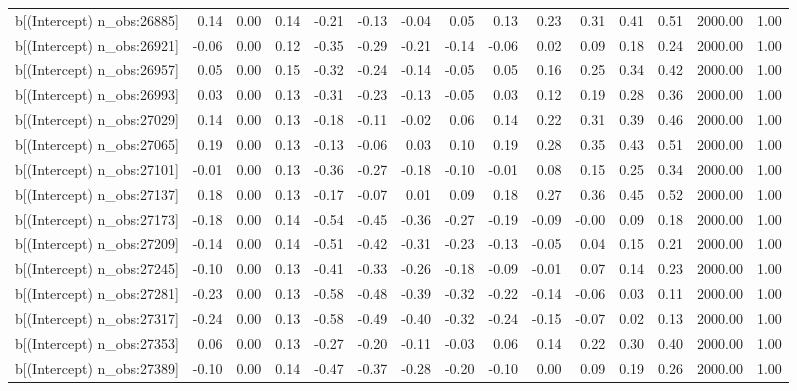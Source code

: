 \begin{table}[ht]
\begin{tabular}{rrrrrrrrrrrrrrr}
  b[(Intercept) n\_obs:26885] & 0.14 & 0.00 & 0.14 & -0.21 & -0.13 & -0.04 & 0.05 & 0.13 & 0.23 & 0.31 & 0.41 & 0.51 & 2000.00 & 1.00 \\ 
  b[(Intercept) n\_obs:26921] & -0.06 & 0.00 & 0.12 & -0.35 & -0.29 & -0.21 & -0.14 & -0.06 & 0.02 & 0.09 & 0.18 & 0.24 & 2000.00 & 1.00 \\ 
  b[(Intercept) n\_obs:26957] & 0.05 & 0.00 & 0.15 & -0.32 & -0.24 & -0.14 & -0.05 & 0.05 & 0.16 & 0.25 & 0.34 & 0.42 & 2000.00 & 1.00 \\ 
  b[(Intercept) n\_obs:26993] & 0.03 & 0.00 & 0.13 & -0.31 & -0.23 & -0.13 & -0.05 & 0.03 & 0.12 & 0.19 & 0.28 & 0.36 & 2000.00 & 1.00 \\ 
  b[(Intercept) n\_obs:27029] & 0.14 & 0.00 & 0.13 & -0.18 & -0.11 & -0.02 & 0.06 & 0.14 & 0.22 & 0.31 & 0.39 & 0.46 & 2000.00 & 1.00 \\ 
  b[(Intercept) n\_obs:27065] & 0.19 & 0.00 & 0.13 & -0.13 & -0.06 & 0.03 & 0.10 & 0.19 & 0.28 & 0.35 & 0.43 & 0.51 & 2000.00 & 1.00 \\ 
  b[(Intercept) n\_obs:27101] & -0.01 & 0.00 & 0.13 & -0.36 & -0.27 & -0.18 & -0.10 & -0.01 & 0.08 & 0.15 & 0.25 & 0.34 & 2000.00 & 1.00 \\ 
  b[(Intercept) n\_obs:27137] & 0.18 & 0.00 & 0.13 & -0.17 & -0.07 & 0.01 & 0.09 & 0.18 & 0.27 & 0.36 & 0.45 & 0.52 & 2000.00 & 1.00 \\ 
  b[(Intercept) n\_obs:27173] & -0.18 & 0.00 & 0.14 & -0.54 & -0.45 & -0.36 & -0.27 & -0.19 & -0.09 & -0.00 & 0.09 & 0.18 & 2000.00 & 1.00 \\ 
  b[(Intercept) n\_obs:27209] & -0.14 & 0.00 & 0.14 & -0.51 & -0.42 & -0.31 & -0.23 & -0.13 & -0.05 & 0.04 & 0.15 & 0.21 & 2000.00 & 1.00 \\ 
  b[(Intercept) n\_obs:27245] & -0.10 & 0.00 & 0.13 & -0.41 & -0.33 & -0.26 & -0.18 & -0.09 & -0.01 & 0.07 & 0.14 & 0.23 & 2000.00 & 1.00 \\ 
  b[(Intercept) n\_obs:27281] & -0.23 & 0.00 & 0.13 & -0.58 & -0.48 & -0.39 & -0.32 & -0.22 & -0.14 & -0.06 & 0.03 & 0.11 & 2000.00 & 1.00 \\ 
  b[(Intercept) n\_obs:27317] & -0.24 & 0.00 & 0.13 & -0.58 & -0.49 & -0.40 & -0.32 & -0.24 & -0.15 & -0.07 & 0.02 & 0.13 & 2000.00 & 1.00 \\ 
  b[(Intercept) n\_obs:27353] & 0.06 & 0.00 & 0.13 & -0.27 & -0.20 & -0.11 & -0.03 & 0.06 & 0.14 & 0.22 & 0.30 & 0.40 & 2000.00 & 1.00 \\ 
  b[(Intercept) n\_obs:27389] & -0.10 & 0.00 & 0.14 & -0.47 & -0.37 & -0.28 & -0.20 & -0.10 & 0.00 & 0.09 & 0.19 & 0.26 & 2000.00 & 1.00 \\ 

\end{tabular}
\end{table}
